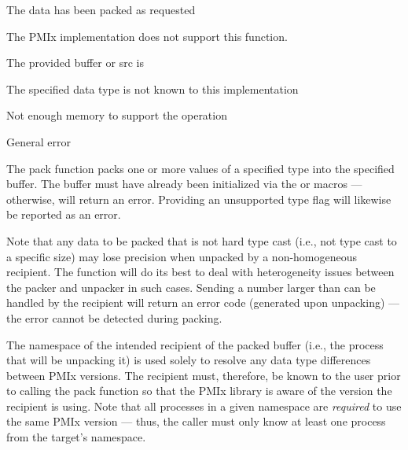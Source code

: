 \returnstart
\begin{constantdesc}
\item {} The data has been packed as requested
\item {} The \ac{PMIx} implementation does not support this function.
\item {} The provided buffer or src is 
\item {} The specified data type is not known to this implementation
\item {} Not enough memory to support the operation
\item {} General error
\end{constantdesc}
\returnend

\descr

The pack function packs one or more values of a specified type into the specified buffer.  The buffer must have already been
initialized via the  or 
macros --- otherwise,  will return an error.
Providing an unsupported type flag will likewise be reported as an error.

Note that any data to be packed that is not hard type cast (i.e.,
not type cast to a specific size) may lose precision when unpacked
by a non-homogeneous recipient.  The  function will do its best to deal
with heterogeneity issues between the packer and unpacker in such
cases. Sending a number larger than can be handled by the recipient
will return an error code (generated upon unpacking) ---
the error cannot be detected during packing.

The namespace of the intended recipient of the packed buffer (i.e., the
process that will be unpacking it) is used solely to resolve any data type
differences between \ac{PMIx} versions. The recipient must, therefore, be
known to the user prior to calling the pack function so that the
\ac{PMIx} library is aware of the version the recipient is using. Note that
all processes in a given namespace are \textit{required} to use the same \ac{PMIx}
version --- thus, the caller must only know at least one process from the
target's namespace.


\subsection{}

